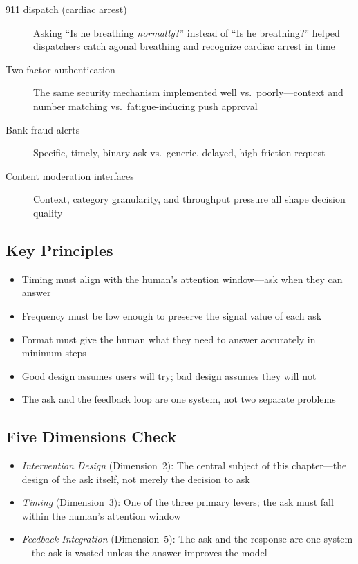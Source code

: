 \begin{description}
  \item[911 dispatch (cardiac arrest)] Asking ``Is he breathing \emph{normally}?'' instead of ``Is he breathing?'' helped dispatchers catch agonal breathing and recognize cardiac arrest in time
  \item[Two-factor authentication] The same security mechanism implemented well vs.\ poorly---context and number matching vs.\ fatigue-inducing push approval
  \item[Bank fraud alerts] Specific, timely, binary ask vs.\ generic, delayed, high-friction request
  \item[Content moderation interfaces] Context, category granularity, and throughput pressure all shape decision quality
\end{description}

\subsection*{Key Principles}

\begin{itemize}
  \item Timing must align with the human's attention window---ask when they can answer
  \item Frequency must be low enough to preserve the signal value of each ask
  \item Format must give the human what they need to answer accurately in minimum steps
  \item Good design assumes users will try; bad design assumes they will not
  \item The ask and the feedback loop are one system, not two separate problems
\end{itemize}

\subsection*{Five Dimensions Check}

\begin{itemize}
  \item \textit{Intervention Design} (Dimension~2): The central subject of this chapter---the design of the ask itself, not merely the decision to ask
  \item \textit{Timing} (Dimension~3): One of the three primary levers; the ask must fall within the human's attention window
  \item \textit{Feedback Integration} (Dimension~5): The ask and the response are one system---the ask is wasted unless the answer improves the model
\end{itemize}

